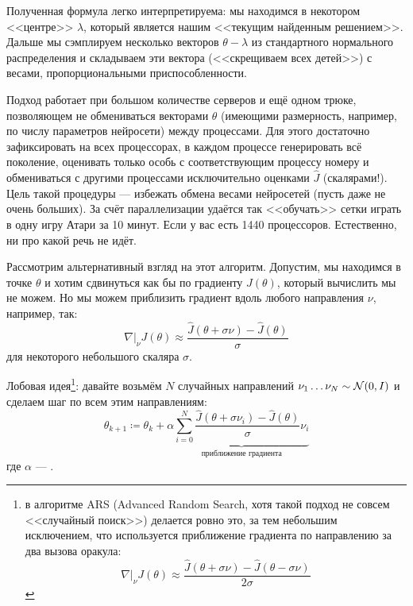 Полученная формула легко интерпретируема: мы находимся в некотором <<центре>> $\lambda$, который является нашим <<текущим найденным решением>>. Дальше мы сэмплируем несколько векторов $\theta - \lambda$ из стандартного нормального распределения и складываем эти вектора (<<скрещиваем всех детей>>) с весами, пропорциональными приспособленности.


\begin{remark}
Подход работает при большом количестве серверов и ещё одном трюке, позволяющем не обмениваться векторами $\theta$ (имеющими размерность, например, по числу параметров нейросети) между процессами. Для этого достаточно зафиксировать  на всех процессорах, в каждом процессе генерировать всё поколение, оценивать только особь с соответствующим процессу номеру и обмениваться с другими процессами исключительно оценками $\hat{J}$ (скалярами!). Цель такой процедуры --- избежать обмена весами нейросетей (пусть даже не очень больших). За счёт параллелизации удаётся так <<обучать>> сетки играть в одну игру Атари за 10 минут. Если у вас есть 1440 процессоров. Естественно, ни про какой  речь не идёт. 
\end{remark}

\begin{example}[OpenAI-ES]
\begin{center}
\end{center}
\end{example}

Рассмотрим альтернативный взгляд на этот алгоритм. Допустим, мы находимся в точке $\theta$ и хотим сдвинуться как бы по градиенту $J(\theta)$, который вычислить мы не можем. Но мы можем приблизить градиент вдоль любого направления $\nu$, например, так:
$$ \left. \nabla \right|_{\nu} J(\theta) \approx \frac{\hat{J}(\theta + \sigma \nu) - \hat{J}(\theta)}{\sigma}$$
для некоторого небольшого скаляра $\sigma$.

Лобовая идея\footnote{в алгоритме ARS (Advanced Random Search, хотя такой подход не совсем <<случайный поиск>>) делается ровно это, за тем небольшим исключением, что используется приближение градиента по направлению за два вызова оракула:
$$ \left. \nabla \right|_{\nu} J(\theta) \approx \frac{\hat{J}(\theta + \sigma \nu) - \hat{J}(\theta - \sigma \nu)}{2\sigma}$$}: давайте возьмём $N$ случайных направлений $\nu_1 \dots \nu_N \sim \mathcal{N}(0, I)$ и сделаем шаг по всем этим направлениям:
\begin{equation}\label{ars}
\theta_{k+1} \coloneqq \theta_k + \alpha \underbrace{\sum_{i=0}^N \frac{\hat{J}(\theta + \sigma \nu_i) - \hat{J}(\theta)}{\sigma}\nu_i}_{\text{приближение градиента}}
\end{equation}
где $\alpha$ --- .


